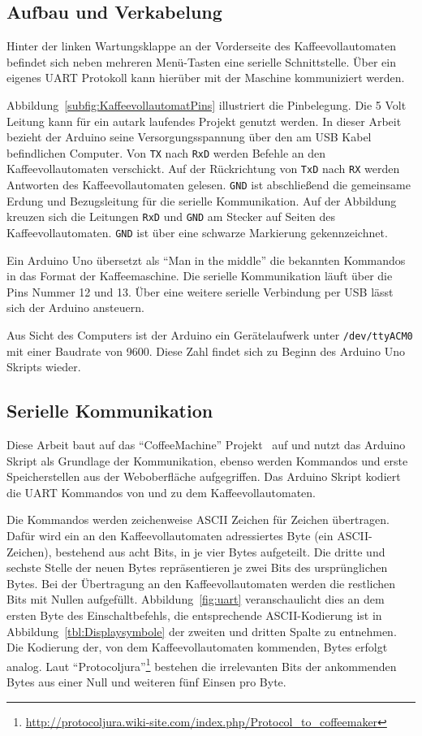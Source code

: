 \subsection{Aufbau und Verkabelung}\label{subsec:AufbauUndVerkabelung}
Hinter der linken Wartungsklappe an der Vorderseite des Kaffeevollautomaten befindet sich neben mehreren Menü-Tasten eine serielle Schnittstelle.
Über ein eigenes \ac{UART} Protokoll kann hierüber mit der Maschine kommuniziert werden.

Abbildung~\ref{subfig:KaffeevollautomatPins} illustriert die Pinbelegung.
Die 5 Volt Leitung kann für ein autark laufendes Projekt genutzt werden.
In dieser Arbeit bezieht der Arduino seine Versorgungsspannung über den am USB Kabel befindlichen Computer.
Von \texttt{TX} nach \texttt{RxD} werden Befehle an den Kaffeevollautomaten verschickt.
Auf der Rückrichtung von \texttt{TxD} nach \texttt{RX} werden Antworten des Kaffeevollautomaten gelesen.
\texttt{GND} ist abschließend die gemeinsame Erdung und Bezugsleitung für die serielle Kommunikation.
Auf der Abbildung kreuzen sich die Leitungen \texttt{RxD} und \texttt{GND} am Stecker auf Seiten des Kaffeevollautomaten.
\texttt{GND} ist über eine schwarze Markierung gekennzeichnet.

Ein Arduino Uno übersetzt als "`Man in the middle"' die bekannten Kommandos in das Format der Kaffeemaschine.
Die serielle Kommunikation läuft über die Pins Nummer 12 und 13.
Über eine weitere serielle Verbindung per USB lässt sich der Arduino ansteuern.

Aus Sicht des Computers ist der Arduino ein Gerätelaufwerk unter \texttt{/dev/ttyACM0} mit einer Baudrate von 9600.
Diese Zahl findet sich zu Beginn des Arduino Uno Skripts wieder.

\subsection{Serielle Kommunikation}
Diese Arbeit baut auf das "`CoffeeMachine"' Projekt~\cite{GitCoffeeMachine} auf und nutzt das Arduino Skript als Grundlage der Kommunikation, ebenso werden Kommandos und erste Speicherstellen aus der Weboberfläche aufgegriffen.
Das Arduino Skript kodiert die \ac{UART} Kommandos von und zu dem Kaffeevollautomaten.

Die Kommandos werden zeichenweise \acs{ASCII} Zeichen für Zeichen übertragen.
Dafür wird ein an den Kaffeevollautomaten adressiertes Byte (ein \acs{ASCII}-Zeichen), bestehend aus acht Bits, in je vier Bytes aufgeteilt.
Die dritte und sechste Stelle der neuen Bytes repräsentieren je zwei Bits des ursprünglichen Bytes.
Bei der Übertragung an den Kaffeevollautomaten werden die restlichen Bits mit Nullen aufgefüllt.
Abbildung~\ref{fig:uart} veranschaulicht dies an dem ersten Byte des Einschaltbefehls, die entsprechende \ac{ASCII}-Kodierung ist in Abbildung~\ref{tbl:Displaysymbole} der zweiten und dritten Spalte zu entnehmen.
Die Kodierung der, von dem Kaffeevollautomaten kommenden, Bytes erfolgt analog.
Laut "`Protocoljura"'\footnote{\url{http://protocoljura.wiki-site.com/index.php/Protocol_to_coffeemaker}} bestehen die irrelevanten Bits der ankommenden Bytes aus einer Null und weiteren fünf Einsen pro Byte.

